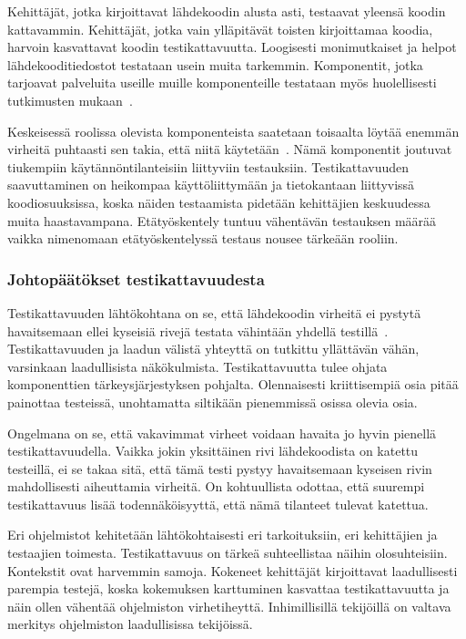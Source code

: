 \documentclass[finnish]{../tktltiki2}
\theoremstyle{definition}
\theoremstyle{remark}
\begin{document}
    Kehittäjät, jotka kirjoittavat lähdekoodin alusta asti, testaavat yleensä koodin kattavammin. Kehittäjät, jotka vain 
ylläpitävät toisten kirjoittamaa koodia, harvoin kasvattavat koodin testikattavuutta. Loogisesti monimutkaiset 
ja helpot lähdekooditiedostot testataan usein muita tarkemmin. Komponentit, jotka tarjoavat palveluita useille muille 
komponenteille testataan myös huolellisesti tutkimusten mukaan~\cite{MNDT09}.

    Keskeisessä roolissa olevista komponenteista saatetaan toisaalta löytää enemmän virheitä puhtaasti sen takia, että 
niitä käytetään~\cite{MNDT09}. Nämä komponentit joutuvat tiukempiin käytännöntilanteisiin liittyviin testauksiin. 
Testikattavuuden saavuttaminen on heikompaa käyttöliittymään ja tietokantaan liittyvissä koodiosuuksissa, koska näiden 
testaamista pidetään kehittäjien keskuudessa muita haastavampana. Etätyöskentely tuntuu vähentävän testauksen määrää 
vaikka nimenomaan etätyöskentelyssä testaus nousee tärkeään rooliin.

\subsubsection{Johtopäätökset testikattavuudesta}

Testikattavuuden lähtökohtana on se, että lähdekoodin virheitä ei pystytä havaitsemaan ellei kyseisiä rivejä testata 
vähintään yhdellä testillä~\cite{MNDT09}. Testikattavuuden ja laadun välistä yhteyttä on tutkittu yllättävän vähän, 
varsinkaan laadullisista näkökulmista. Testikattavuutta tulee ohjata komponenttien tärkeysjärjestyksen pohjalta. 
Olennaisesti kriittisempiä osia pitää painottaa testeissä, unohtamatta siltikään pienemmissä osissa olevia osia.

    Ongelmana on se, että vakavimmat virheet voidaan havaita jo hyvin pienellä testikattavuudella. Vaikka jokin 
yksittäinen rivi lähdekoodista on katettu testeillä, ei se takaa sitä, että tämä testi pystyy havaitsemaan kyseisen 
rivin mahdollisesti aiheuttamia virheitä. On kohtuullista odottaa, että suurempi testikattavuus lisää todennäköisyyttä, 
että nämä tilanteet tulevat katettua.

    Eri ohjelmistot kehitetään lähtökohtaisesti eri tarkoituksiin, eri kehittäjien ja testaajien toimesta. 
Testikattavuus on tärkeä suhteellistaa näihin olosuhteisiin. Kontekstit ovat harvemmin samoja. Kokeneet kehittäjät 
kirjoittavat laadullisesti parempia testejä, koska kokemuksen karttuminen kasvattaa testikattavuutta ja näin ollen 
vähentää ohjelmiston virhetiheyttä. Inhimillisillä tekijöillä on valtava merkitys ohjelmiston laadullisissa tekijöissä.
\end{document}
